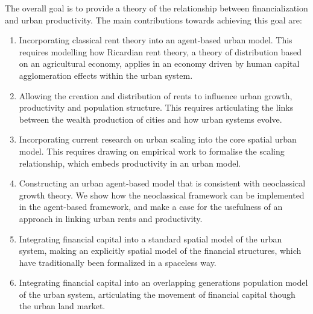 The overall goal is to provide a theory of the relationship between financialization and urban productivity. The main contributions towards achieving this goal are:
\begin{enumerate}
    \item  Incorporating \gls{classical rent theory} into an \gls{agent-based} urban model. This requires modelling how \gls{Ricardian rent theory}, a theory of distribution based on an agricultural economy, applies %
in an economy driven by human capital \gls{agglomeration} effects within the urban system. 

    \item Allowing the creation and distribution of rents to influence urban growth, productivity and  population structure. This requires articulating the links between the wealth production of cities and  how urban systems evolve.

    \item Incorporating current research on \gls{urban scaling} into the core spatial urban model.  This requires drawing on empirical work to formalise the scaling relationship, which embeds productivity in an urban model. %

    \item Constructing an urban \gls{agent-based model} that is consistent with {neoclassical growth theory}. We show how the neoclassical framework can be implemented in the agent-based framework, and make a case for the usefulness of an approach in linking urban rents and productivity. %

    \item Integrating \gls{financial capital} into a standard spatial model of the urban system, making an explicitly spatial model of the financial structures, which have traditionally been formalized in a spaceless way.
    
    \item Integrating financial capital into an \gls{overlapping generations} population model of the urban system, %
articulating the movement of financial capital though the urban land market. 
    

\end{enumerate}
